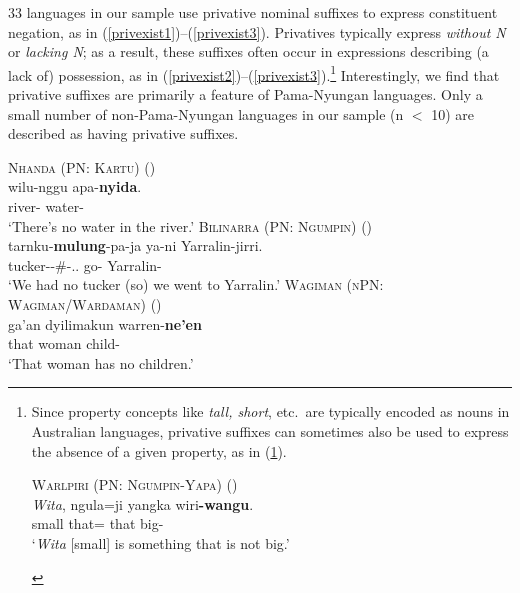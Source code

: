 \documentclass[12pt,egregdoesnotlikesansseriftitles]{scrartcl}
\begin{document}
33 languages in our sample use privative nominal suffixes to express constituent negation, as in (\ref{privexist1})--(\ref{privexist3}). Privatives typically express \textit{without N} or \textit{lacking N}; as a result, these suffixes often occur in expressions describing (a lack of) possession, as in (\ref{privexist2})--(\ref{privexist3}).\footnote{Since property concepts like \textit{tall, short}, etc.\ are typically encoded as nouns in Australian languages, privative suffixes can sometimes also be used to express the absence of a given property, as in (\ref{privproperty1}).
\vspace{-2mm}
\begin{exe}
  \ex \textsc{Warlpiri (PN: Ngumpin-Yapa)} \hfill (\citealt{wdp})\\
  \gll \textit{Wita}, ngula=ji yangka wiri\textbf{-wangu}.\\
  small that=\Top{} that big-\Priv\\
  \glt `\textit{Wita} [small] is something that is not big.'\label{privproperty1}
\end{exe}
} Interestingly, we find that privative suffixes are primarily a feature of Pama-Nyungan languages. Only a small number of non-Pama-Nyungan languages in our sample (n $<$ 10) are described as having privative suffixes.

\begin{exe}
  \ex \textsc{Nhanda (PN: Kartu)} \hfill (\citealt[64]{blevins01}) \label{privexist1}\\
  \gll wilu-nggu apa-\textbf{nyida}.\\
  river-\Loc{} water-\Priv\\
  \glt `There's no water in the river.'
  \ex\label{privexist2}\textsc{Bilinarra (PN: Ngumpin)} \hfill (\citealt[122]{nordlinger90})\\
  \gll tarnku-\textbf{mulung}-pa-ja ya-ni Yarralin-jirri.\\
  tucker-\Priv-\#-\Fdu.\Excl.\Sarg{} go-\Pst{} Yarralin-\All\\
  \glt `We had no tucker (so) we went to Yarralin.'
  \ex \textsc{Wagiman (nPN: Wagiman/Wardaman)} \hfill (\citealt[150]{wilson06})\\
  \gll ga'an dyilimakun warren-\textbf{ne'en}\\ %
  that woman child-\Priv\\
  \glt `That woman has no children.' \label{privexist3}
\end{exe}
\end{document}
